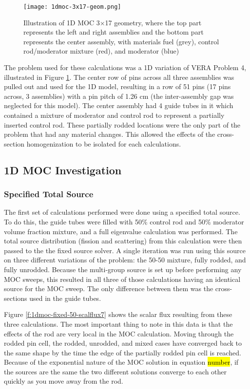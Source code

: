 \begin{figure}
    \centering
    \texttt{[image: 1dmoc-3x17-geom.png]}
    \caption[Illustration of 1D MOC Test Geometry]{Illustration of 1D MOC 3$\times$17 geometry, where the top part represents the left and right assemblies and the bottom part represents the center assembly, with materials fuel (grey), control rod/moderator mixture (red), and moderator (blue)}\label{f:1dmoc-17x17-geom}
\end{figure}

The problem used for these calculations was a 1D variation of VERA Problem 4, illustrated in Figure \ref{f:1dmoc-17x17-geom}.  The center row of pins across all three assemblies was pulled out and used for the 1D model, resulting in a row of 51 pins (17 pins across, 3 assemblies) with a pin pitch of 1.26 cm (the inter-assembly gap was neglected for this model).  The center assembly had 4 guide tubes in it which contained a mixture of moderator and control rod to represent a partially inserted control rod.  These partially rodded locations were the only part of the problem that had any material changes.  This allowed the effects of the cross-section homogenization to be isolated for each calculations.

\subsection{1D MOC Investigation}

\subsubsection{Specified Total Source}

The first set of calculations performed were done using a specified total source.  To do this, the guide tubes were filled with 50\% control rod and 50\% moderator volume fraction mixture, and a full eigenvalue calculation was performed.  The total source distribution (fission and scattering) from this calculation were then passed to the the fixed source solver.  A single iteration was run using this source on three different variations of the problem: the 50-50 mixture, fully rodded, and fully unrodded.  Because the multi-group source is set up before performing any MOC sweeps, this resulted in all three of those calculations having an identical source for the MOC sweep.  The only difference between them was the cross-sections used in the guide tubes.

Figure \ref{f:1dmoc-fixed-50-scalflux7} shows the scalar flux resulting from these three calculations.  The most important thing to note in this data is that the effects of the rod are very local in the MOC calculation.  Moving through the rodded pin cell, the rodded, unrodded, and mixed cases have converged back to the same shape by the time the edge of the partially rodded pin cell is reached.  Because of the exponential nature of the MOC solution in equation \hl{number}, if the sources are the same the two different solutions converge to each other quickly as you move away from the rod.

